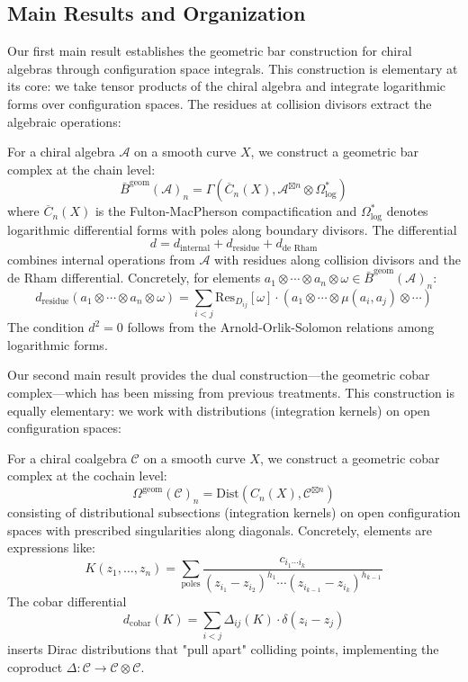 \subsection{Main Results and Organization}

Our first main result establishes the geometric bar construction for chiral algebras through configuration space integrals. This construction is elementary at its core: we take tensor products of the chiral algebra and integrate logarithmic forms over configuration spaces. The residues at collision divisors extract the algebraic operations:

\begin{theorem}
For a chiral algebra $\mathcal{A}$ on a smooth curve $X$, we construct a geometric bar complex at the chain level:
$$\bar{B}^{\text{geom}}(\mathcal{A})_n = \Gamma\left(\overline{C}_n(X), \mathcal{A}^{\boxtimes n} \otimes \Omega^*_{\text{log}}\right)$$
where $\overline{C}_n(X)$ is the Fulton-MacPherson compactification and $\Omega^*_{\text{log}}$ denotes logarithmic differential forms with poles along boundary divisors. The differential 
$$d = d_{\text{internal}} + d_{\text{residue}} + d_{\text{de Rham}}$$
combines internal operations from $\mathcal{A}$ with residues along collision divisors and the de Rham differential. Concretely, for elements $a_1 \otimes \cdots \otimes a_n \otimes \omega \in \bar{B}^{\text{geom}}(\mathcal{A})_n$:
$$d_{\text{residue}}(a_1 \otimes \cdots \otimes a_n \otimes \omega) = \sum_{i<j} \text{Res}_{D_{ij}}[\omega] \cdot (a_1 \otimes \cdots \otimes \mu(a_i, a_j) \otimes \cdots)$$
The condition $d^2 = 0$ follows from the Arnold-Orlik-Solomon relations among logarithmic forms.
\end{theorem}

Our second main result provides the dual construction—the geometric cobar complex—which has been missing from previous treatments. This construction is equally elementary: we work with distributions (integration kernels) on open configuration spaces:

\begin{theorem}
For a chiral coalgebra $\mathcal{C}$ on a smooth curve $X$, we construct a geometric cobar complex at the cochain level:
$$\Omega^{\text{geom}}(\mathcal{C})_n = \text{Dist}(C_n(X), \mathcal{C}^{\boxtimes n})$$
consisting of distributional subsections (integration kernels) on open configuration spaces with prescribed singularities along diagonals. Concretely, elements are expressions like:
$$K(z_1, \ldots, z_n) = \sum_{\text{poles}} \frac{c_{i_1 \cdots i_k}}{(z_{i_1} - z_{i_2})^{h_1} \cdots (z_{i_{k-1}} - z_{i_k})^{h_{k-1}}}$$
The cobar differential
$$d_{\text{cobar}}(K) = \sum_{i<j} \Delta_{ij}(K) \cdot \delta(z_i - z_j)$$
inserts Dirac distributions that "pull apart" colliding points, implementing the coproduct $\Delta: \mathcal{C} \to \mathcal{C} \otimes \mathcal{C}$.
\end{theorem}

